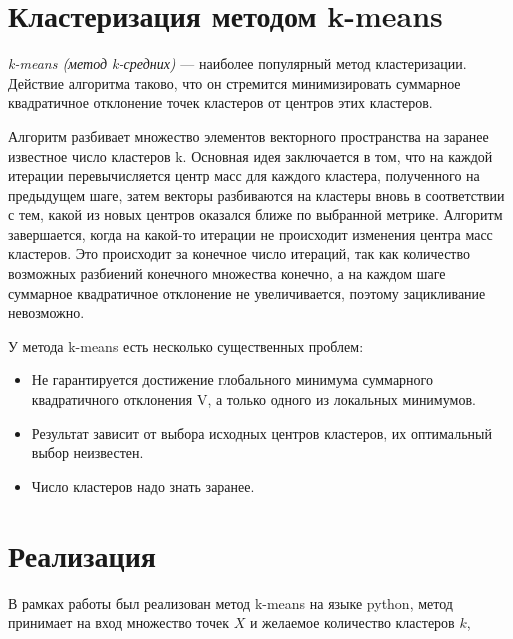 \documentclass[12pt,a4paper,oneside]{extarticle}
\begin{document}
\section{Кластеризация методом k-means}
    {\it k-means (метод k-средних)} --- наиболее популярный метод кластеризации. Действие алгоритма таково, что он стремится минимизировать суммарное квадратичное отклонение точек кластеров от центров этих кластеров.

    Алгоритм разбивает множество элементов векторного пространства на заранее известное число кластеров k. Основная идея заключается в том, что на каждой итерации перевычисляется центр масс для каждого кластера, полученного на предыдущем шаге, затем векторы разбиваются на кластеры вновь в соответствии с тем, какой из новых центров оказался ближе по выбранной метрике. Алгоритм завершается, когда на какой-то итерации не происходит изменения центра масс кластеров. Это происходит за конечное число итераций, так как количество возможных разбиений конечного множества конечно, а на каждом шаге суммарное квадратичное отклонение не увеличивается, поэтому зацикливание невозможно.

    У метода k-means есть несколько существенных проблем:
    \begin{itemize}
        \item Не гарантируется достижение глобального минимума суммарного квадратичного отклонения V, а только одного из локальных минимумов.
        \item Результат зависит от выбора исходных центров кластеров, их оптимальный выбор неизвестен.
        \item Число кластеров надо знать заранее.
    \end{itemize}

\section{Реализация}
    В рамках работы был реализован метод k-means на языке python, метод принимает на вход множество точек $X$ и желаемое количество кластеров $k$,
\end{document}
